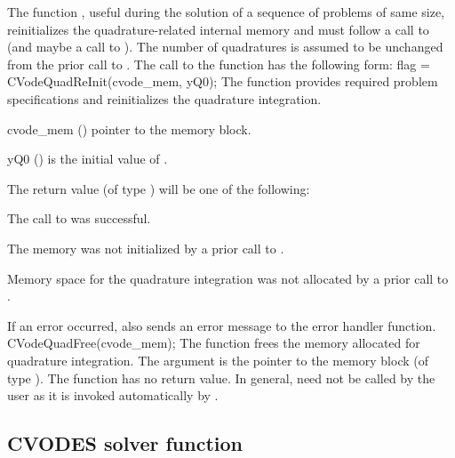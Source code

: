The function , useful during the solution of a sequence of problems of
same size, reinitializes the quadrature-related internal memory
and must follow a call to  (and maybe a call to ).
The number  of quadratures is assumed to be unchanged from the prior call to
.
The call to the  function has the following form:
{
  flag = CVodeQuadReInit(cvode\_mem, yQ0);
}
{
  The function  provides required problem specifications
  and reinitializes the quadrature integration.
}
{
  \begin{args}
  \item[cvode\_mem] ()
    pointer to the {\cvodes} memory block.
  \item[yQ0] ()
    is the initial value of .
  \end{args}
}
{
  The return value  (of type ) will be one of the following:
  \begin{args}
  \item[\Id{CV\_SUCCESS}]
    The call to  was successful.
  \item[\Id{CV\_MEM\_NULL}]
    The {\cvodes} memory was not initialized by a prior call to .
  \item[\Id{CV\_NO\_QUAD}]
    Memory space for the quadrature integration was not allocated by a prior
    call to .
  \end{args}
}
{
  If an error occurred,  also sends an error message to the
  error handler function.
}
{
  CVodeQuadFree(cvode\_mem);
}
{
  The function  frees the memory allocated for quadrature integration.
}
{
  The argument is the pointer to the {\cvodes} memory block (of type ).
}
{
  The function  has no return value.
}
{
  In general,  need not be called by the user as it is
  invoked automatically by .
}


\subsection{CVODES solver function}

